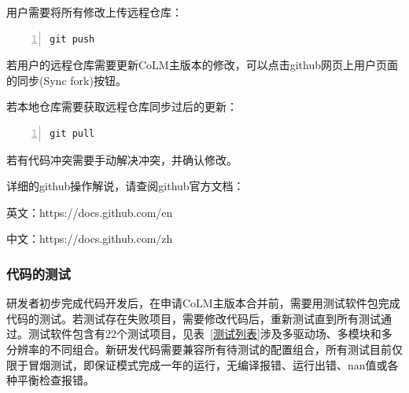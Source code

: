 用户需要将所有修改上传远程仓库：

\begin{lstlisting}[language=fortran, basicstyle=\linespread{1.0}\footnotesize\ttfamily, commentstyle=\color{olive}, numbers=left, numberstyle=\tiny, xleftmargin=1.5em,xrightmargin=0em, aboveskip=1em]
   git push
\end{lstlisting}

若用户的远程仓库需要更新CoLM主版本的修改，可以点击github网页上用户页面的同步(Sync fork)按钮。

若本地仓库需要获取远程仓库同步过后的更新：

\begin{lstlisting}[language=fortran, basicstyle=\linespread{1.0}\footnotesize\ttfamily, commentstyle=\color{olive}, numbers=left, numberstyle=\tiny, xleftmargin=1.5em,xrightmargin=0em, aboveskip=1em]
   git pull
\end{lstlisting}


若有代码冲突需要手动解决冲突，并确认修改。

详细的github操作解说，请查阅github官方文档：

英文：https://docs.github.com/en

中文：https://docs.github.com/zh


\subsubsection{代码的测试}

研发者初步完成代码开发后，在申请CoLM主版本合并前，需要用测试软件包完成代码的测试。若测试存在失败项目，需要修改代码后，重新测试直到所有测试通过。测试软件包含有22个测试项目，见表~\ref{测试列表}涉及多驱动场、多模块和多分辨率的不同组合。新研发代码需要兼容所有待测试的配置组合，所有测试目前仅限于冒烟测试，即保证模式完成一年的运行，无编译报错、运行出错、nan值或各种平衡检查报错。

